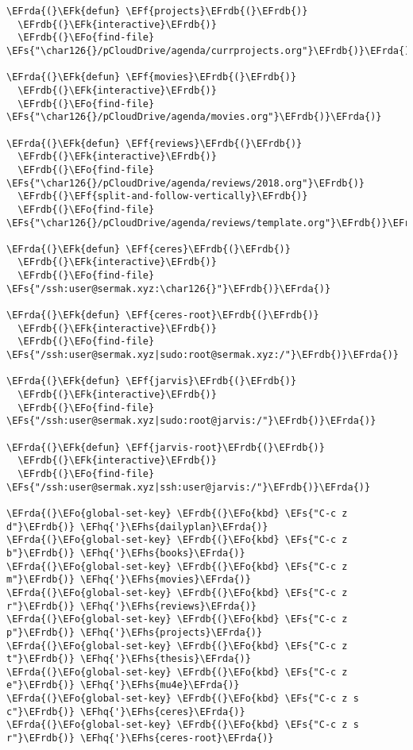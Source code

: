 \documentclass[a4wide,10pt]{article}
\newcommand{\EFs}[1]{\textcolor{EFs}{#1}} %
\newcommand{\EFk}[1]{\textcolor{EFk}{#1}} %
\newcommand{\EFf}[1]{\textcolor{EFf}{#1}} %
\newcommand{\EFo}[1]{\textcolor{EFo}{#1}} %
\newcommand{\EFhq}[1]{\textcolor{EFhq}{#1}} %
\newcommand{\EFhs}[1]{\textcolor{EFhs}{#1}} %
\newcommand{\EFrda}[1]{\textcolor{EFrda}{#1}} %
\newcommand{\EFrdb}[1]{\textcolor{EFrdb}{#1}} %
\begin{document}
\begin{Code}
\begin{Verbatim}
\EFrda{(}\EFk{defun} \EFf{projects}\EFrdb{(}\EFrdb{)}
  \EFrdb{(}\EFk{interactive}\EFrdb{)}
  \EFrdb{(}\EFo{find-file} \EFs{"\char126{}/pCloudDrive/agenda/currprojects.org"}\EFrdb{)}\EFrda{)}

\EFrda{(}\EFk{defun} \EFf{movies}\EFrdb{(}\EFrdb{)}
  \EFrdb{(}\EFk{interactive}\EFrdb{)}
  \EFrdb{(}\EFo{find-file} \EFs{"\char126{}/pCloudDrive/agenda/movies.org"}\EFrdb{)}\EFrda{)}

\EFrda{(}\EFk{defun} \EFf{reviews}\EFrdb{(}\EFrdb{)}
  \EFrdb{(}\EFk{interactive}\EFrdb{)}
  \EFrdb{(}\EFo{find-file} \EFs{"\char126{}/pCloudDrive/agenda/reviews/2018.org"}\EFrdb{)}
  \EFrdb{(}\EFf{split-and-follow-vertically}\EFrdb{)}
  \EFrdb{(}\EFo{find-file} \EFs{"\char126{}/pCloudDrive/agenda/reviews/template.org"}\EFrdb{)}\EFrda{)}

\EFrda{(}\EFk{defun} \EFf{ceres}\EFrdb{(}\EFrdb{)}
  \EFrdb{(}\EFk{interactive}\EFrdb{)}
  \EFrdb{(}\EFo{find-file} \EFs{"/ssh:user@sermak.xyz:\char126{}"}\EFrdb{)}\EFrda{)}

\EFrda{(}\EFk{defun} \EFf{ceres-root}\EFrdb{(}\EFrdb{)}
  \EFrdb{(}\EFk{interactive}\EFrdb{)}
  \EFrdb{(}\EFo{find-file} \EFs{"/ssh:user@sermak.xyz|sudo:root@sermak.xyz:/"}\EFrdb{)}\EFrda{)}

\EFrda{(}\EFk{defun} \EFf{jarvis}\EFrdb{(}\EFrdb{)}
  \EFrdb{(}\EFk{interactive}\EFrdb{)}
  \EFrdb{(}\EFo{find-file} \EFs{"/ssh:user@sermak.xyz|sudo:root@jarvis:/"}\EFrdb{)}\EFrda{)}

\EFrda{(}\EFk{defun} \EFf{jarvis-root}\EFrdb{(}\EFrdb{)}
  \EFrdb{(}\EFk{interactive}\EFrdb{)}
  \EFrdb{(}\EFo{find-file} \EFs{"/ssh:user@sermak.xyz|ssh:user@jarvis:/"}\EFrdb{)}\EFrda{)}

\EFrda{(}\EFo{global-set-key} \EFrdb{(}\EFo{kbd} \EFs{"C-c z d"}\EFrdb{)} \EFhq{'}\EFhs{dailyplan}\EFrda{)}
\EFrda{(}\EFo{global-set-key} \EFrdb{(}\EFo{kbd} \EFs{"C-c z b"}\EFrdb{)} \EFhq{'}\EFhs{books}\EFrda{)}
\EFrda{(}\EFo{global-set-key} \EFrdb{(}\EFo{kbd} \EFs{"C-c z m"}\EFrdb{)} \EFhq{'}\EFhs{movies}\EFrda{)}
\EFrda{(}\EFo{global-set-key} \EFrdb{(}\EFo{kbd} \EFs{"C-c z r"}\EFrdb{)} \EFhq{'}\EFhs{reviews}\EFrda{)}
\EFrda{(}\EFo{global-set-key} \EFrdb{(}\EFo{kbd} \EFs{"C-c z p"}\EFrdb{)} \EFhq{'}\EFhs{projects}\EFrda{)}
\EFrda{(}\EFo{global-set-key} \EFrdb{(}\EFo{kbd} \EFs{"C-c z t"}\EFrdb{)} \EFhq{'}\EFhs{thesis}\EFrda{)}
\EFrda{(}\EFo{global-set-key} \EFrdb{(}\EFo{kbd} \EFs{"C-c z e"}\EFrdb{)} \EFhq{'}\EFhs{mu4e}\EFrda{)}
\EFrda{(}\EFo{global-set-key} \EFrdb{(}\EFo{kbd} \EFs{"C-c z s c"}\EFrdb{)} \EFhq{'}\EFhs{ceres}\EFrda{)}
\EFrda{(}\EFo{global-set-key} \EFrdb{(}\EFo{kbd} \EFs{"C-c z s r"}\EFrdb{)} \EFhq{'}\EFhs{ceres-root}\EFrda{)}


\end{Verbatim}
\end{Code}
\end{document}
